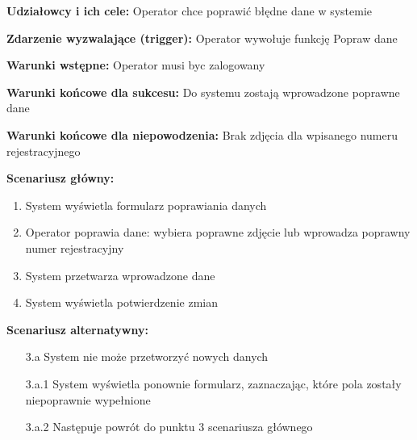 \hspace{0cm}\textbf{Udziałowcy i ich cele: }Operator chce poprawić błędne dane w systemie

\hspace{0cm}\textbf{Zdarzenie wyzwalające (trigger): }Operator wywołuje funkcję Popraw dane

\hspace{0cm}\textbf{Warunki wstępne: }
Operator musi byc zalogowany

\hspace{0cm}\textbf{Warunki końcowe dla sukcesu: }Do systemu zostają wprowadzone poprawne dane

\hspace{0cm}\textbf{Warunki końcowe dla niepowodzenia: }Brak zdjęcia dla wpisanego numeru rejestracyjnego\newline

\hspace{0cm}\textbf{Scenariusz główny: }
\begin{enumerate}
\item System wyświetla formularz poprawiania danych
\item Operator poprawia dane: wybiera poprawne zdjęcie lub wprowadza poprawny numer rejestracyjny
\item System przetwarza wprowadzone dane
\item System wyświetla potwierdzenie zmian
\end{enumerate}

\hspace{0cm}\textbf{Scenariusz alternatywny: }
\begin{enumerate}
\item[3.a] System nie może przetworzyć nowych danych
\item[3.a.1] System wyświetla ponownie formularz, zaznaczając, które pola zostały niepoprawnie wypełnione
\item[3.a.2] Następuje powrót do punktu 3 scenariusza głównego
\end{enumerate}
